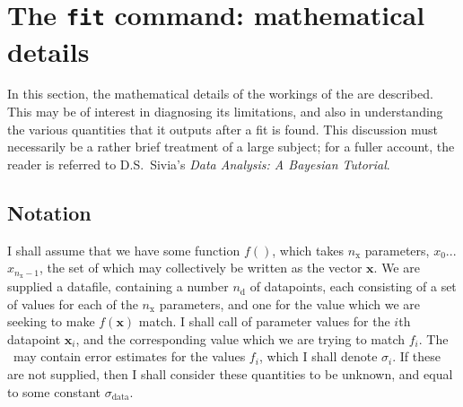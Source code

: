 %
%
%
%
%



\chapter{The {\tt fit} command: mathematical details}
\label{ch:fit_maths}

In this section, the mathematical details of the workings of the 
are described. This may be of interest in diagnosing its limitations, and also
in understanding the various quantities that it outputs after a fit is found.
This discussion must necessarily be a rather brief treatment of a large
subject; for a fuller account, the reader is referred to D.S.\ Sivia's {\it
Data Analysis: A Bayesian Tutorial}.

\section{Notation}
\label{sec:bayes_notation}

I shall assume that we have some function $f()$, which takes $n_\mathrm{x}$
parameters, $x_0$...$x_{n_\mathrm{x}-1}$, the set of which may collectively be
written as the vector $\mathbf{x}$. We are supplied a datafile, containing a
number $n_\mathrm{d}$ of datapoints, each consisting of a set of values for
each of the $n_\mathrm{x}$ parameters, and one for the value which we are
seeking to make $f(\mathbf{x})$ match. I shall call of parameter values for the
$i$th datapoint $\mathbf{x}_i$, and the corresponding value which we are trying
to match $f_i$. The \datafile\ may contain error estimates for the values $f_i$,
which I shall denote $\sigma_i$. If these are not supplied, then I shall
consider these quantities to be unknown, and equal to some constant
$\sigma_\mathrm{data}$.

